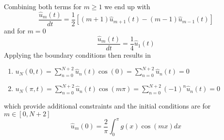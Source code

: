 Combining both terms for $m \geq 1$ we end up with
\begin{equation}
	\frac{\hat{u}_m (t)}{dt} = \frac{1}{2} \left [ (m+1) \hat{u}_{m+1}(t) - (m-1)\hat{u}_{m-1}(t)\right]
	\label{eq:sol3a}
\end{equation}
and for $m=0$
\begin{equation}
	\frac{\hat{u}_m (t)}{dt} = \frac{1}{4}\hat{u}_1(t)
	\label{eq:sol3b}
\end{equation}
Applying the boundary conditions then results in
\begin{enumerate}
	\item $u_N(0,t) = \sum_{n=0}^{N+2} \hat{u}_n (t) \cos(0) =  \sum_{n=0}^{N+2} \hat{u}_n (t) = 0$
	\item $u_N(\pi,t) = \sum_{n=0}^{N+2} \hat{u}_n (t) \cos(m\pi) =  \sum_{n=0}^{N+2} (-1)^n \hat{u}_n (t) = 0$
\end{enumerate}
which provide additional constraints and the initial conditions are for $m\in [0,N+2]$
\begin{equation}
	\hat{u}_m(0) = \frac{2}{\pi}\int_0^{\pi} g(x)\cos(mx)dx
	\label{eq:init3}
\end{equation}
